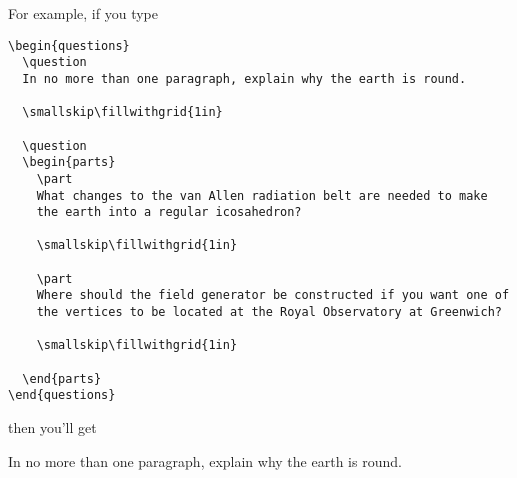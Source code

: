 \documentclass[12pt]{exam}
\begin{document}
For example, if you type
\begin{verbatim}
\begin{questions}
  \question 
  In no more than one paragraph, explain why the earth is round.

  \smallskip\fillwithgrid{1in}
  
  \question
  \begin{parts}
    \part
    What changes to the van Allen radiation belt are needed to make
    the earth into a regular icosahedron?

    \smallskip\fillwithgrid{1in}

    \part
    Where should the field generator be constructed if you want one of
    the vertices to be located at the Royal Observatory at Greenwich?

    \smallskip\fillwithgrid{1in}

  \end{parts}
\end{questions}
\end{verbatim}
then you'll get
\begin{questions}
  \question 
  In no more than one paragraph, explain why the earth is round.

  \smallskip\fillwithgrid{1in}
  
  \question
\end{questions}
\end{document}
